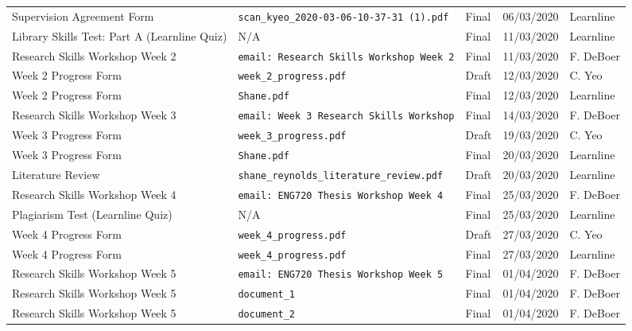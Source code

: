 \documentclass[10pt, landscape]{article}
\begin{document}
\begin{longtable}{p{7cm}p{10cm}p{1.5cm}p{2cm}p{2cm}}
	Supervision Agreement Form						& \verb|scan_kyeo_2020-03-06-10-37-31 (1).pdf|								& Final				& 06/03/2020			& Learnline\\
	
	Library Skills Test: Part A (Learnline Quiz)	& N/A																		& Final 			& 11/03/2020		 	& Learnline\\
	
	Research Skills Workshop Week 2					& \verb|email: Research Skills Workshop Week 2|								& Final				& 11/03/2020		 	& F. DeBoer\\
	
	Week 2 Progress Form							& \verb|week_2_progress.pdf|												& Draft				& 12/03/2020			& C. Yeo\\
	
	Week 2 Progress Form							& \verb|Shane.pdf|															& Final				& 12/03/2020			& Learnline\\
	
	Research Skills Workshop Week 3					& \verb|email: Week 3 Research Skills Workshop|								& Final				& 14/03/2020		 	& F. DeBoer\\
	
	Week 3 Progress Form							& \verb|week_3_progress.pdf|												& Draft				& 19/03/2020			& C. Yeo\\
		
	Week 3 Progress Form							& \verb|Shane.pdf|															& Final				& 20/03/2020			& Learnline\\
	
	Literature Review 								& \verb|shane_reynolds_literature_review.pdf|								& Draft 			& 20/03/2020		 	& Learnline\\
	
	Research Skills Workshop Week 4					& \verb|email: ENG720 Thesis Workshop Week 4|								& Final				& 25/03/2020		 	& F. DeBoer\\
	
	Plagiarism Test (Learnline Quiz)				& N/A																		& Final 			& 25/03/2020		 	& Learnline\\
	
	Week 4 Progress Form							& \verb|week_4_progress.pdf|												& Draft				& 27/03/2020			& C. Yeo\\
			
	Week 4 Progress Form							& \verb|week_4_progress.pdf|												& Final				& 27/03/2020			& Learnline\\
	
	Research Skills Workshop Week 5					& \verb|email: ENG720 Thesis Workshop Week 5|								& Final				& 01/04/2020		 	& F. DeBoer\\
	
	Research Skills Workshop Week 5					& \verb|document_1|								& Final				& 01/04/2020		 	& F. DeBoer\\
	
	Research Skills Workshop Week 5					& \verb|document_2|								& Final				& 01/04/2020		 	& F. DeBoer\\
	\bottomrule
	\end{longtable}
\end{document}
